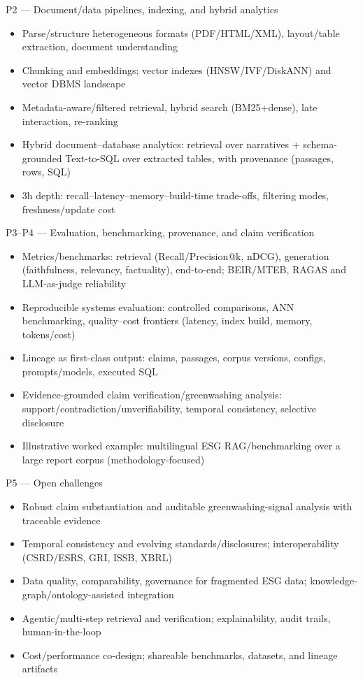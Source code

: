 \documentclass[aspectratio=169]{beamer}
\begin{document}
\begin{frame}{P2 --- Document/data pipelines, indexing, and hybrid analytics}
  \begin{itemize}
    \item Parse/structure heterogeneous formats (PDF/HTML/XML), layout/table extraction, document understanding
    \item Chunking and embeddings; vector indexes (HNSW/IVF/DiskANN) and vector DBMS landscape
    \item Metadata-aware/filtered retrieval, hybrid search (BM25+dense), late interaction, re-ranking
    \item Hybrid document--database analytics: retrieval over narratives + schema-grounded Text-to-SQL over extracted tables, with provenance (passages, rows, SQL)
    \item 3h depth: recall--latency--memory--build-time trade-offs, filtering modes, freshness/update cost
  \end{itemize}
\end{frame}

\begin{frame}{P3--P4 --- Evaluation, benchmarking, provenance, and claim verification}
  \begin{itemize}
    \item Metrics/benchmarks: retrieval (Recall/Precision@k, nDCG), generation (faithfulness, relevancy, factuality), end-to-end; BEIR/MTEB, RAGAS and LLM-as-judge reliability
    \item Reproducible systems evaluation: controlled comparisons, ANN benchmarking, quality--cost frontiers (latency, index build, memory, tokens/cost)
    \item Lineage as first-class output: claims, passages, corpus versions, configs, prompts/models, executed SQL
    \item Evidence-grounded claim verification/greenwashing analysis: support/contradiction/unverifiability, temporal consistency, selective disclosure
    \item Illustrative worked example: multilingual ESG RAG/benchmarking over a large report corpus (methodology-focused)
  \end{itemize}
\end{frame}

\begin{frame}{P5 --- Open challenges}
  \begin{itemize}
    \item Robust claim substantiation and auditable greenwashing-signal analysis with traceable evidence
    \item Temporal consistency and evolving standards/disclosures; interoperability (CSRD/ESRS, GRI, ISSB, XBRL)
    \item Data quality, comparability, governance for fragmented ESG data; knowledge-graph/ontology-assisted integration
    \item Agentic/multi-step retrieval and verification; explainability, audit trails, human-in-the-loop
    \item Cost/performance co-design; shareable benchmarks, datasets, and lineage artifacts
  \end{itemize}
\end{frame}
\end{document}
